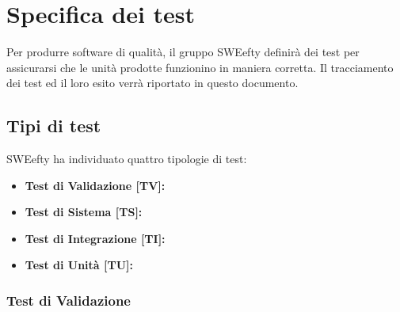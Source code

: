 \section{Specifica dei test}
Per produrre software di qualità, il gruppo SWEefty definirà dei test per assicurarsi che le unità prodotte funzionino in maniera corretta. Il tracciamento dei test ed il loro esito verrà riportato in questo documento.
	\subsection{Tipi di test}
	SWEefty ha individuato quattro tipologie di test:
	\begin{itemize}
		\item {\textbf{Test di Validazione [TV]:} }
		\item {\textbf{Test di Sistema [TS]:} }
		\item {\textbf{Test di Integrazione [TI]:} }
		\item {\textbf{Test di Unità [TU]:} }
	\end{itemize} 
		
		\subsubsection{Test di Validazione}